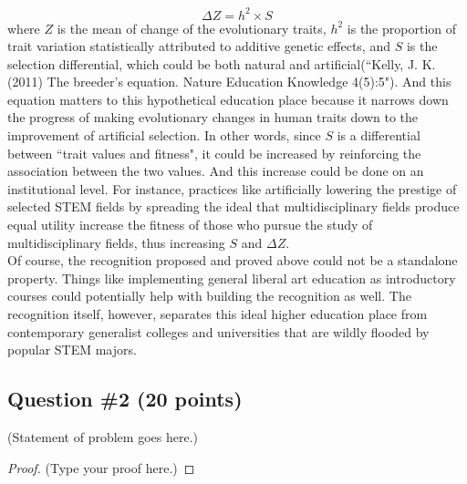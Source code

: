 \documentclass[12pt]{article}
\newcommand\tab[1][1cm]{\hspace*{#1}}
\begin{document}
\begin{equation}
\Delta Z = h^2 \times S
\end{equation}
where $Z$ is the mean of change of the evolutionary traits, $h^2$ is the proportion of trait variation statistically attributed to additive genetic effects, and $S$ is the selection differential, which could be both natural and artificial(``Kelly, J. K. (2011) The breeder's equation. Nature Education Knowledge 4(5):5"). And this equation matters to this hypothetical education place because it narrows down the progress of making evolutionary changes in human traits down to the improvement of artificial selection. In other words, since $S$ is a differential between ``trait values and fitness", it could be increased by reinforcing the association between the two values. And this increase could be done on an institutional level. For instance, practices like artificially lowering the prestige of selected STEM fields by spreading the ideal that multidisciplinary fields produce equal utility increase the fitness of those who pursue the study of multidisciplinary fields, thus increasing $S$ and $\Delta Z$. \\
\tab Of course, the recognition proposed and proved above could not be a standalone property. Things like implementing general liberal art education as introductory courses could potentially help with building the recognition as well. The recognition itself, however, separates this ideal higher education place from contemporary generalist colleges and universities that are wildly flooded by popular STEM majors. 


\pagebreak
\subsection*{Question \#2 (20 points)}
(Statement of problem goes here.)\\

\begin{proof}
(Type your proof here.)
\end{proof}

\end{document}
